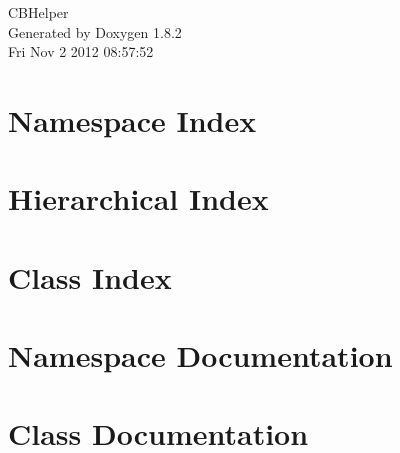 \documentclass{book}
\begin{document}
\begin{titlepage}
\vspace*{7cm}
\begin{center}
{\Large C\-B\-Helper }\\
\vspace*{1cm}
{\large Generated by Doxygen 1.8.2}\\
\vspace*{0.5cm}
{\small Fri Nov 2 2012 08:57:52}\\
\end{center}
\end{titlepage}
\clearemptydoublepage
{}
\tableofcontents
\clearemptydoublepage
{}
\chapter{Namespace Index}

\chapter{Hierarchical Index}

\chapter{Class Index}

\chapter{Namespace Documentation}

\chapter{Class Documentation}








\printindex
\end{document}
